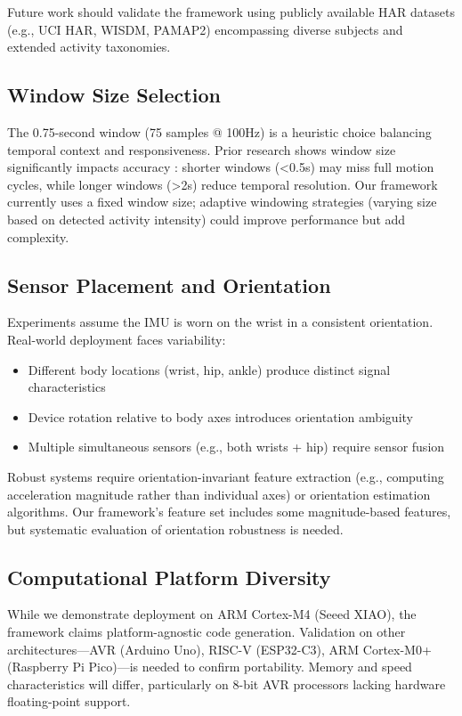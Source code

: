 Future work should validate the framework using publicly available HAR datasets (e.g., UCI HAR, WISDM, PAMAP2) encompassing diverse subjects and extended activity taxonomies.

\subsection{Window Size Selection}
The 0.75-second window (75 samples @ 100Hz) is a heuristic choice balancing temporal context and responsiveness. Prior research shows window size significantly impacts accuracy \cite{banos2014wisdm}: shorter windows (<0.5s) may miss full motion cycles, while longer windows (>2s) reduce temporal resolution. Our framework currently uses a fixed window size; adaptive windowing strategies (varying size based on detected activity intensity) could improve performance but add complexity.

\subsection{Sensor Placement and Orientation}
Experiments assume the IMU is worn on the wrist in a consistent orientation. Real-world deployment faces variability:
\begin{itemize}
    \item Different body locations (wrist, hip, ankle) produce distinct signal characteristics
    \item Device rotation relative to body axes introduces orientation ambiguity
    \item Multiple simultaneous sensors (e.g., both wrists + hip) require sensor fusion
\end{itemize}

Robust systems require orientation-invariant feature extraction (e.g., computing acceleration magnitude rather than individual axes) or orientation estimation algorithms. Our framework's feature set includes some magnitude-based features, but systematic evaluation of orientation robustness is needed.

\subsection{Computational Platform Diversity}
While we demonstrate deployment on ARM Cortex-M4 (Seeed XIAO), the framework claims platform-agnostic code generation. Validation on other architectures—AVR (Arduino Uno), RISC-V (ESP32-C3), ARM Cortex-M0+ (Raspberry Pi Pico)—is needed to confirm portability. Memory and speed characteristics will differ, particularly on 8-bit AVR processors lacking hardware floating-point support.

